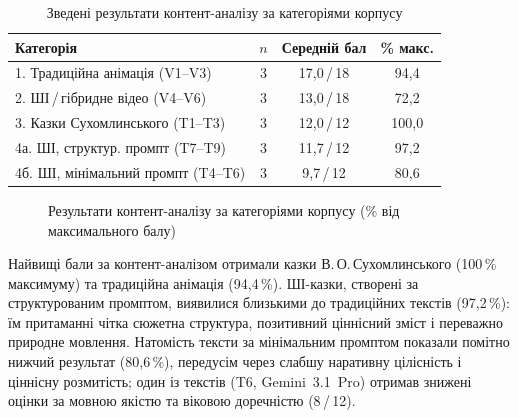 \documentclass[14pt, a4paper]{extreport}
\begin{document}
\begin{table}[htbp]
\caption{Зведені результати контент-аналізу за категоріями корпусу}
\centering
\begin{tabular}{|p{6cm}|c|c|c|}
\hline
\rowcolor{tblhead}\textbf{Категорія} & \textbf{$n$} & \textbf{Середній бал} & \textbf{\% макс.} \\
\hline
1. Традиційна анімація (V1--V3)        & 3 & 17{,}0\,/\,18 & 94{,}4 \\
2. ШІ\,/\,гібридне відео (V4--V6)      & 3 & 13{,}0\,/\,18 & 72{,}2 \\
3. Казки Сухомлинського (T1--T3)       & 3 & 12{,}0\,/\,12 & 100{,}0  \\
4а. ШІ, структур. промпт (T7--T9)     & 3 & 11{,}7\,/\,12 & 97{,}2 \\
4б. ШІ, мінімальний промпт (T4--T6)   & 3 &  9{,}7\,/\,12 & 80{,}6 \\
\hline
\end{tabular}
\end{table}

\begin{figure}[htbp]
\centering
{}
\caption{Результати контент-аналізу за категоріями корпусу (\% від максимального балу)}
\end{figure}

Найвищі бали за контент-аналізом отримали казки В.\,О.\,Сухомлинського (100\,\% максимуму) та традиційна анімація (94{,}4\,\%). ШІ-казки, створені за структурованим промптом, виявилися близькими до традиційних текстів (97{,}2\,\%): їм притаманні чітка сюжетна структура, позитивний ціннісний зміст і переважно природне мовлення. Натомість тексти за мінімальним промптом показали помітно нижчий результат (80{,}6\,\%), передусім через слабшу наративну цілісність і ціннісну розмитість; один із текстів (T6, Gemini~3.1~Pro) отримав знижені оцінки за мовною якістю та віковою доречністю (8\,/\,12).
\end{document}
